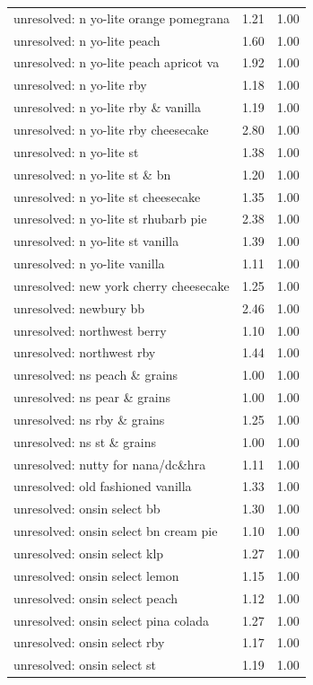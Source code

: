 \begin{table}
\begin{tabular}{lrr}
unresolved: n yo-lite orange pomegrana & 1.21 & 1.00 \\
unresolved: n yo-lite peach & 1.60 & 1.00 \\
unresolved: n yo-lite peach apricot va & 1.92 & 1.00 \\
unresolved: n yo-lite rby & 1.18 & 1.00 \\
unresolved: n yo-lite rby \& vanilla & 1.19 & 1.00 \\
unresolved: n yo-lite rby cheesecake & 2.80 & 1.00 \\
unresolved: n yo-lite st & 1.38 & 1.00 \\
unresolved: n yo-lite st \& bn & 1.20 & 1.00 \\
unresolved: n yo-lite st cheesecake & 1.35 & 1.00 \\
unresolved: n yo-lite st rhubarb pie & 2.38 & 1.00 \\
unresolved: n yo-lite st vanilla & 1.39 & 1.00 \\
unresolved: n yo-lite vanilla & 1.11 & 1.00 \\
unresolved: new york cherry cheesecake & 1.25 & 1.00 \\
unresolved: newbury bb & 2.46 & 1.00 \\
unresolved: northwest berry & 1.10 & 1.00 \\
unresolved: northwest rby & 1.44 & 1.00 \\
unresolved: ns peach \& grains & 1.00 & 1.00 \\
unresolved: ns pear \& grains & 1.00 & 1.00 \\
unresolved: ns rby \& grains & 1.25 & 1.00 \\
unresolved: ns st \& grains & 1.00 & 1.00 \\
unresolved: nutty for nana/dc\&hra & 1.11 & 1.00 \\
unresolved: old fashioned vanilla & 1.33 & 1.00 \\
unresolved: onsin select bb & 1.30 & 1.00 \\
unresolved: onsin select bn cream pie & 1.10 & 1.00 \\
unresolved: onsin select klp & 1.27 & 1.00 \\
unresolved: onsin select lemon & 1.15 & 1.00 \\
unresolved: onsin select peach & 1.12 & 1.00 \\
unresolved: onsin select pina colada & 1.27 & 1.00 \\
unresolved: onsin select rby & 1.17 & 1.00 \\
unresolved: onsin select st & 1.19 & 1.00 \\

\end{tabular}
\end{table}
